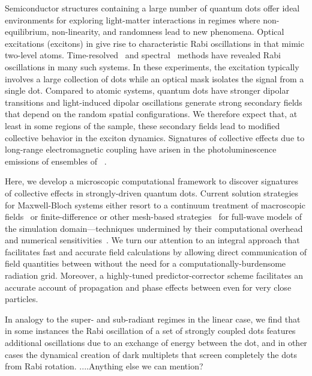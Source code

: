 Semiconductor structures containing a large number of quantum dots offer ideal environments for exploring light-matter interactions in regimes where non-equilibrium, non-linearity, and randomness lead to new phenomena.
Optical excitations (excitons) in give rise to characteristic Rabi oscillations in \qds{} that mimic two-level atoms.
Time-resolved~\cite{stievater,shih} and spectral~\cite{kamada} methods have revealed Rabi oscillations in many such systems.
In these experiments, the excitation typically involves a large collection of dots while an optical mask isolates the signal from a single dot.
Compared to atomic systems, quantum dots have stronger dipolar transitions and light-induced dipolar oscillations generate strong secondary fields that  depend on the random spatial configurations.
We therefore expect that, at least in some regions of the sample, these secondary fields lead to modified collective behavior in the exciton dynamics.
Signatures of collective effects due to long-range electromagnetic coupling have arisen in the photoluminescence emissions of ensembles of \qds{}~\cite{forchel}.

Here, we develop a microscopic computational framework to discover signatures of collective effects in strongly-driven quantum dots.
Current solution strategies for Maxwell-Bloch systems either resort to a continuum treatment of macroscopic fields~\cite{} or finite-difference or other mesh-based strategies~\cite{Vanneste2001, Fratalocchi2008} for full-wave models of the simulation domain---techniques undermined by their computational overhead and numerical sensitivities~\cite{Baczewski2013}.
We turn our attention to an integral approach that facilitates fast and accurate field calculations by allowing direct communication of field quantities between \qds{} without the need for a computationally-burdensome radiation grid.
Moreover, a highly-tuned predictor-corrector scheme facilitates an accurate account of propagation and phase effects between \qds{} even for very close particles. 

In analogy to the super- and sub-radiant regimes in the linear case, we find that in some instances the Rabi oscillation of a set of strongly coupled dots features additional oscillations due to an exchange of energy between the dot, and in other cases the dynamical creation of dark multiplets that screen completely the dots from Rabi rotation. ....Anything else we can mention?
